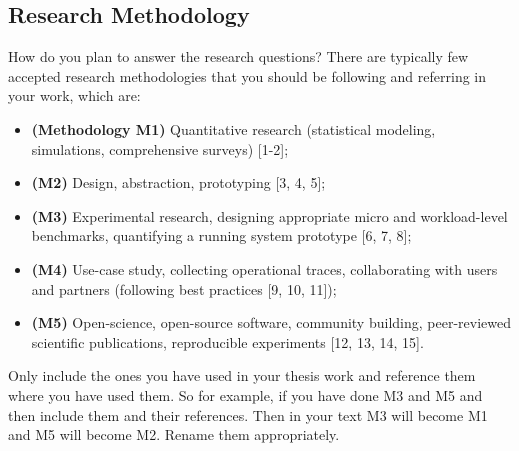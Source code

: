 \documentclass[11pt]{article}
\begin{document}
\subsection{Research Methodology}
How do you plan to answer the research questions? There are typically few accepted research  methodologies that you should be following and referring in your work, which are: 
\begin{itemize}
    \item \textbf{(Methodology  M1)} Quantitative research (statistical modeling, simulations, comprehensive surveys) [1-2];
    \item \textbf{(M2)} Design, abstraction, prototyping [3, 4, 5];
    \item \textbf{(M3)} Experimental research, designing appropriate micro and workload-level benchmarks, quantifying a running system prototype [6, 7, 8];
    \item \textbf{(M4)} Use-case study, collecting operational traces, collaborating with users and partners (following best practices [9, 10, 11]);
    \item \textbf{(M5)} Open-science, open-source software, community building, peer-reviewed scientific publications, reproducible experiments [12, 13, 14, 15].
\end{itemize}

Only include the ones you have used in your thesis work and reference them where you have used them. So for example, if you have done M3 and M5 and then include them and their references. Then in your text M3 will become M1 and M5 will become M2. Rename them appropriately. 
\newline
\end{document}
